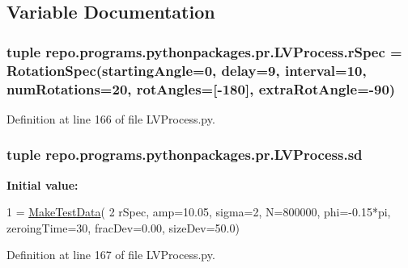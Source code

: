 \subsection{Variable Documentation}
\hypertarget{namespacerepo_1_1programs_1_1pythonpackages_1_1pr_1_1LVProcess_a79e153708bc016c970b43165bc080e87}{
\subsubsection[{r\-Spec}]{\setlength{\rightskip}{0pt plus 5cm}tuple repo.\-programs.\-pythonpackages.\-pr.\-L\-V\-Process.\-r\-Spec = Rotation\-Spec(starting\-Angle=0, delay=9, interval=10, num\-Rotations=20, rot\-Angles=\mbox{[}-\/180\mbox{]}, extra\-Rot\-Angle=-\/90)}}\label{namespacerepo_1_1programs_1_1pythonpackages_1_1pr_1_1LVProcess_a79e153708bc016c970b43165bc080e87}


Definition at line 166 of file L\-V\-Process.\-py.

\hypertarget{namespacerepo_1_1programs_1_1pythonpackages_1_1pr_1_1LVProcess_a14a936929069fcd8b4decd4743803799}{
\subsubsection[{sd}]{\setlength{\rightskip}{0pt plus 5cm}tuple repo.\-programs.\-pythonpackages.\-pr.\-L\-V\-Process.\-sd}}\label{namespacerepo_1_1programs_1_1pythonpackages_1_1pr_1_1LVProcess_a14a936929069fcd8b4decd4743803799}
{\bfseries Initial value\-:}
\begin{DoxyCode}
1 = \hyperlink{namespacerepo_1_1programs_1_1pythonpackages_1_1pr_1_1LVProcess_a543482946297257ed0bb421f40e64f05}{MakeTestData}(
2         rSpec, amp=10.05, sigma=2, N=800000, phi=-0.15*pi, zeroingTime=30, fracDev=0.00, sizeDev=50.0)
\end{DoxyCode}


Definition at line 167 of file L\-V\-Process.\-py.

